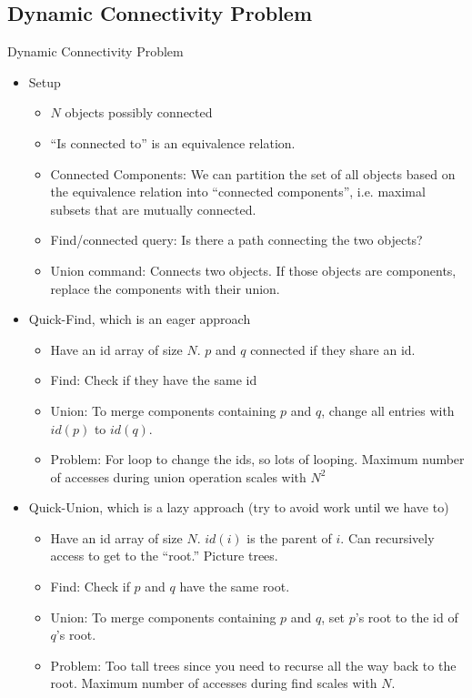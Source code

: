 \documentclass[12pt]{article}
\theoremstyle{plain}
\theoremstyle{definition}
\theoremstyle{remark}
\begin{document}
\subsection{Dynamic Connectivity Problem}

Dynamic Connectivity Problem
\begin{itemize}
  \item Setup
    \begin{itemize}
      \item $N$ objects possibly connected
      \item ``Is connected to'' is an equivalence relation.
      \item Connected Components:
        We can partition the set of all objects based on the equivalence
        relation into ``connected components'', i.e. maximal subsets that
        are mutually connected.
      \item Find/connected query: Is there a path connecting the two
        objects?
      \item Union command: Connects two objects.
        If those objects are components, replace the components with
        their union.
    \end{itemize}
  \item Quick-Find, which is an eager approach
    \begin{itemize}
      \item Have an id array of size $N$.
        $p$ and $q$ connected if they share an id.
      \item Find: Check if they have the same id
      \item Union: To merge components containing $p$ and $q$, change
        all entries with $id(p)$ to $id(q)$.
      \item Problem: For loop to change the ids, so lots of looping.
        Maximum number of accesses during union operation scales with
        $N^2$
    \end{itemize}
  \item Quick-Union, which is a lazy approach (try to avoid work until
    we have to)
    \begin{itemize}
      \item Have an id array of size $N$.
        $id(i)$ is the parent of $i$.
        Can recursively access to get to the ``root.''
        Picture trees.
      \item Find: Check if $p$ and $q$ have the same root.
      \item Union: To merge components containing $p$ and $q$,
        set $p$'s root to the id of $q$'s root.
      \item Problem: Too tall trees since you need to recurse all the
        way back to the root.
        Maximum number of accesses during find scales with $N$.


\end{itemize}
\end{itemize}
\end{document}
